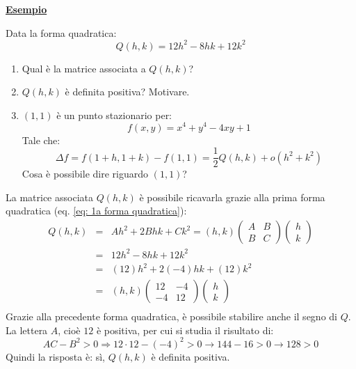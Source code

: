 \documentclass[a4paper]{article}
\newcommand{\example}[1]{\textcolor{Green4}{\textbf{#1}}}
\begin{document}
	\begin{flushleft}
		\example{\underline{Esempio}}
	\end{flushleft}
	Data la forma quadratica:
	\begin{equation*}
		Q\left(h,k\right) = 12h^{2} - 8hk + 12k^{2}
	\end{equation*}
	\begin{enumerate}[label=\alph*)]
		\item Qual è la matrice associata a $Q\left(h,k\right)$?
		\item $Q\left(h,k\right)$ è definita positiva? Motivare.
		\item $\left(1,1\right)$ è un punto stazionario per:
		\begin{equation*}
			f\left(x,y\right) = x^{4} + y^{4} - 4xy + 1
		\end{equation*}
		Tale che:
		\begin{equation*}
			\Delta f = f\left(1+h, 1+k\right) - f\left(1,1\right) = \dfrac{1}{2}Q\left(h,k\right) + o\left(h^{2} + k^{2}\right)
		\end{equation*}
		Cosa è possibile dire riguardo $\left(1,1\right)$?
	\end{enumerate}
	La matrice associata $Q\left(h,k\right)$ è possibile ricavarla grazie alla prima forma quadratica (eq. \ref{eq: 1a forma quadratica}):
	\begin{equation*}
		\begin{array}{rcl}
			Q\left(h,k\right) &=& Ah^{2} + 2B hk + Ck^{2} = \left(h,k\right)\begin{pmatrix}
				A & B \\ B & C
			\end{pmatrix}
			\begin{pmatrix}
				h \\ k
			\end{pmatrix} \\ [1em]
			&=& 12h^{2} - 8hk + 12k^{2} \\ [.5em]
			&=& \left(12\right)h^{2} + 2\left(-4\right)hk + \left(12\right)k^{2} \\ [.5em]
			&=& \left(h,k\right)
			\begin{pmatrix}
				12 & -4 \\ -4 & 12
			\end{pmatrix}
			\begin{pmatrix}
				h \\ k
			\end{pmatrix} \\ [1em]
		\end{array}
	\end{equation*}
	Grazie alla precedente forma quadratica, è possibile stabilire anche il segno di $Q$. La lettera $A$, cioè $12$ è positiva, per cui si studia il risultato di:
	\begin{equation*}
		AC-B^{2} > 0 \Longrightarrow 12 \cdot 12 - \left(-4\right)^{2} > 0 \longrightarrow 144 - 16 > 0 \longrightarrow 128 > 0
	\end{equation*}
	Quindi la risposta è: sì, $Q\left(h,k\right)$ è definita positiva.
\end{document}
